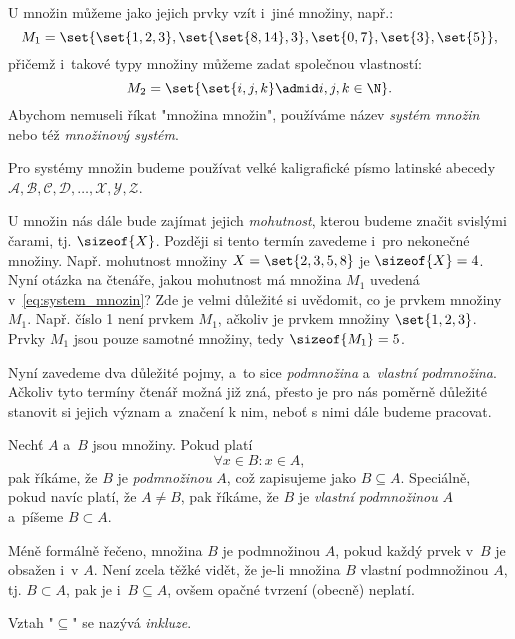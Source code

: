 U množin můžeme jako jejich prvky vzít i~jiné množiny, např.:
\begin{equation}\label{eq:system_mnozin}
    M_1=\set{\set{1,2,3},\set{\set{8,14},3},\set{0,7}, \set{3}, \set{5}},
\end{equation}
přičemž i~takové typy množiny můžeme zadat společnou vlastností:
\begin{equation*}
    M_2=\set{\set{i,j,k} \admid i,j,k\in\N}.
\end{equation*}
Abychom nemuseli říkat "množina množin", používáme název \emph{systém množin} nebo též \emph{množinový systém}.
\begin{convention}
    Pro systémy množin budeme používat velké kaligrafické písmo latinské abecedy $\mathcal{A},\mathcal{B},\mathcal{C},\mathcal{D},\dots,\mathcal{X},\mathcal{Y},\mathcal{Z}$.
\end{convention}
U množin nás dále bude zajímat jejich \emph{mohutnost}, kterou budeme značit svislými čarami, tj. $\sizeof{X}$. Později si tento termín zavedeme i~pro nekonečné množiny. Např. mohutnost množiny $X=\set{2,3,5,8}$ je $\sizeof{X}=4$. Nyní otázka na čtenáře, jakou mohutnost má množina $M_1$ uvedená v~\eqref{eq:system_mnozin}? Zde je velmi důležité si uvědomit, co je prvkem množiny $M_1$. Např. číslo 1 není prvkem $M_1$, ačkoliv je prvkem množiny $\set{1,2,3}$. Prvky $M_1$ jsou pouze samotné množiny, tedy $\sizeof{M_1}=5$.\par
\medskip
Nyní zavedeme dva důležité pojmy, a~to sice \emph{podmnožina} a~\emph{vlastní podmnožina}. Ačkoliv tyto termíny čtenář možná již zná, přesto je pro nás poměrně důležité stanovit si jejich význam a~značení k nim, neboť s nimi dále budeme pracovat.
\begin{definition}\label{def:podmnozina}
    Nechť $A$ a~$B$ jsou množiny. Pokud platí
    \begin{equation*}
        \forall x\in B: x\in A,
    \end{equation*}
    pak říkáme, že $B$ je \emph{podmnožinou} $A$, což zapisujeme jako $B \subseteq A$. Speciálně, pokud navíc platí, že $A \neq B$, pak říkáme, že $B$ je \emph{vlastní podmnožinou} $A$ a~píšeme $B \subset A$.
\end{definition}
Méně formálně řečeno, množina $B$ je podmnožinou $A$, pokud každý prvek v~$B$ je obsažen i~v $A$. Není zcela těžké vidět, že je-li množina $B$ vlastní podmnožinou $A$, tj. $B \subset A$, pak je i~$B \subseteq A$, ovšem opačné tvrzení (obecně) neplatí.
\begin{remark}
    Vztah "$\subseteq$" se nazývá \emph{inkluze}.
\end{remark}
